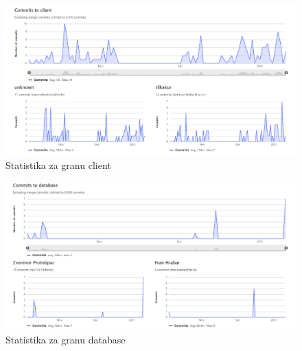  		\begin{figure}[H]
 			\includegraphics[scale=0.45]{slike/stat4.PNG} 
 			\centering
 			\caption{Statistika za granu client}
 			\label{fig:stat4}%
 		\end{figure}
 	
 		 \begin{figure}[H]
 		 	\includegraphics[scale=0.45]{slike/stat5.PNG} 
 		 	\centering
 		 	\caption{Statistika za granu database}
 		 	\label{fig:stat5}%
 		 \end{figure}
	 
		
		
	